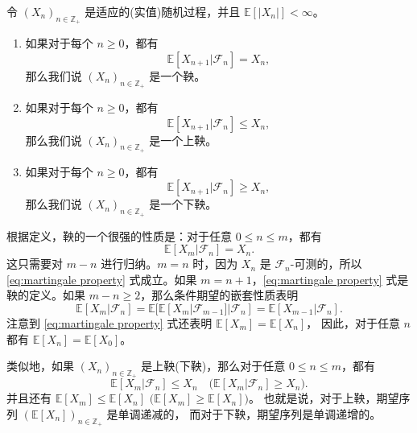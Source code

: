 \documentclass[fontset=none]{Notes}
\begin{document}
\begin{definition}
  令 $(X_n)_{n\in \mathbb{Z}_+}$ 是适应的(实值)随机过程，并且 $\mathbb{E}[|X_n|]<\infty$。
  \begin{enumerate}
    \item 如果对于每个 $n\geq 0$，都有
    \[
      \mathbb{E}[X_{n+1}|\mathcal{F}_n]=X_n,
    \]
    那么我们说 $(X_n)_{n\in \mathbb{Z}_+}$ 是一个鞅。
    \item 如果对于每个 $n\geq 0$，都有
    \[
      \mathbb{E}[X_{n+1}|\mathcal{F}_n]\leq X_n,
    \]
    那么我们说 $(X_n)_{n\in \mathbb{Z}_+}$ 是一个上鞅。
    \item 如果对于每个 $n\geq 0$，都有
    \[
      \mathbb{E}[X_{n+1}|\mathcal{F}_n]\geq X_n,
    \]
    那么我们说 $(X_n)_{n\in \mathbb{Z}_+}$ 是一个下鞅。
  \end{enumerate}
\end{definition}

根据定义，鞅的一个很强的性质是：对于任意 $0\leq n\leq m$，都有
\begin{equation}\label{eq:martingale property}
  \mathbb{E}[X_{m}|\mathcal{F}_n]=X_n.
\end{equation}
这只需要对 $m-n$ 进行归纳。$m=n$ 时，因为 $X_n$ 是 $\mathcal{F}_n$-可测的，所以
\eqref{eq:martingale property} 式成立。如果 $m=n+1$，\eqref{eq:martingale property}
式是鞅的定义。如果 $m-n\geq 2$，那么条件期望的嵌套性质表明 
\[
  \mathbb{E}[X_m| \mathcal{F}_n]=\mathbb{E}[\mathbb{E}[X_m|\mathcal{F}_{m-1}]|\mathcal{F}_n]
  =\mathbb{E}[X_{m-1}|\mathcal{F}_n].
\]
注意到 \eqref{eq:martingale property} 式还表明 $\mathbb{E}[X_m]=\mathbb{E}[X_n]$，
因此，对于任意 $n$ 都有 $\mathbb{E}[X_n]=\mathbb{E}[X_0]$。


类似地，如果 $(X_n)_{n\in \mathbb{Z}_+}$ 是上鞅(下鞅)，那么对于任意 $0\leq n\leq m$，都有
\[
  \mathbb{E}[X_{m}|\mathcal{F}_n]\leq X_n\quad
  \bigl(\mathbb{E}[X_{m}|\mathcal{F}_n]\geq X_n\bigr).
\]
并且还有 $\mathbb{E}[X_m]\leq \mathbb{E}[X_n]$
$\bigl(\mathbb{E}[X_m]\geq \mathbb{E}[X_n]\bigr)$。
也就是说，对于上鞅，期望序列 $(\mathbb{E}[X_n])_{n\in \mathbb{Z}_+}$ 是单调递减的，
而对于下鞅，期望序列是单调递增的。
\end{document}
